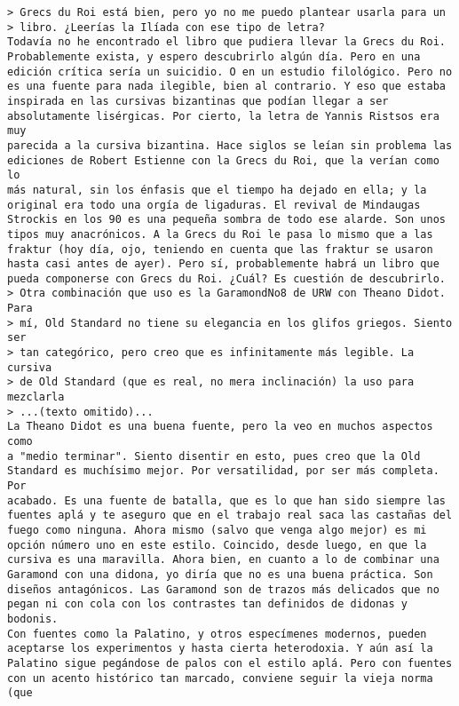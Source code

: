 \documentclass[a4paper,10pt]{article}
\begin{document}
\begin{lstlisting}
> Grecs du Roi está bien, pero yo no me puedo plantear usarla para un
> libro. ¿Leerías la Ilíada con ese tipo de letra?
Todavía no he encontrado el libro que pudiera llevar la Grecs du Roi. 
Probablemente exista, y espero descubrirlo algún día. Pero en una 
edición crítica sería un suicidio. O en un estudio filológico. Pero no 
es una fuente para nada ilegible, bien al contrario. Y eso que estaba 
inspirada en las cursivas bizantinas que podían llegar a ser 
absolutamente lisérgicas. Por cierto, la letra de Yannis Ristsos era muy 
parecida a la cursiva bizantina. Hace siglos se leían sin problema las 
ediciones de Robert Estienne con la Grecs du Roi, que la verían como lo 
más natural, sin los énfasis que el tiempo ha dejado en ella; y la 
original era todo una orgía de ligaduras. El revival de Mindaugas 
Strockis en los 90 es una pequeña sombra de todo ese alarde. Son unos 
tipos muy anacrónicos. A la Grecs du Roi le pasa lo mismo que a las 
fraktur (hoy día, ojo, teniendo en cuenta que las fraktur se usaron 
hasta casi antes de ayer). Pero sí, probablemente habrá un libro que 
pueda componerse con Grecs du Roi. ¿Cuál? Es cuestión de descubrirlo.
> Otra combinación que uso es la GaramondNo8 de URW con Theano Didot. Para
> mí, Old Standard no tiene su elegancia en los glifos griegos. Siento ser
> tan categórico, pero creo que es infinitamente más legible. La cursiva
> de Old Standard (que es real, no mera inclinación) la uso para mezclarla
> ...(texto omitido)...
La Theano Didot es una buena fuente, pero la veo en muchos aspectos como 
a "medio terminar". Siento disentir en esto, pues creo que la Old 
Standard es muchísimo mejor. Por versatilidad, por ser más completa. Por 
acabado. Es una fuente de batalla, que es lo que han sido siempre las 
fuentes aplá y te aseguro que en el trabajo real saca las castañas del 
fuego como ninguna. Ahora mismo (salvo que venga algo mejor) es mi 
opción número uno en este estilo. Coincido, desde luego, en que la 
cursiva es una maravilla. Ahora bien, en cuanto a lo de combinar una 
Garamond con una didona, yo diría que no es una buena práctica. Son 
diseños antagónicos. Las Garamond son de trazos más delicados que no 
pegan ni con cola con los contrastes tan definidos de didonas y bodonis. 
Con fuentes como la Palatino, y otros especímenes modernos, pueden 
aceptarse los experimentos y hasta cierta heterodoxia. Y aún así la 
Palatino sigue pegándose de palos con el estilo aplá. Pero con fuentes 
con un acento histórico tan marcado, conviene seguir la vieja norma (que 

\end{lstlisting}
\end{document}
